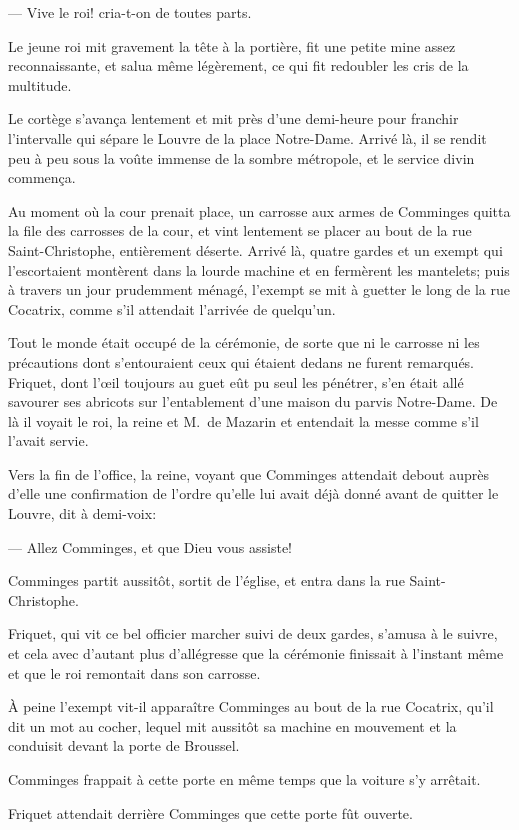 — Vive le roi! cria-t-on de toutes parts.

Le jeune roi mit gravement la tête à la portière, fit une petite mine assez reconnaissante, et salua même légèrement, ce qui fit redoubler les cris de la multitude.

Le cortège s'avança lentement et mit près d'une demi-heure pour franchir l'intervalle qui sépare le Louvre de la place Notre-Dame. Arrivé là, il se rendit peu à peu sous la voûte immense de la sombre métropole, et le service divin commença.

Au moment où la cour prenait place, un carrosse aux armes de Comminges quitta la file des carrosses de la cour, et vint lentement se placer au bout de la rue Saint-Christophe, entièrement déserte. Arrivé là, quatre gardes et un exempt qui l'escortaient montèrent dans la lourde machine et en fermèrent les mantelets; puis à travers un jour prudemment ménagé, l'exempt se mit à guetter le long de la rue Cocatrix, comme s'il attendait l'arrivée de quelqu'un.

Tout le monde était occupé de la cérémonie, de sorte que ni le carrosse ni les précautions dont s'entouraient ceux qui étaient dedans ne furent remarqués. Friquet, dont l'œil toujours au guet eût pu seul les pénétrer, s'en était allé savourer ses abricots sur l'entablement d'une maison du parvis Notre-Dame. De là il voyait le roi, la reine et M.~de Mazarin et entendait la messe comme s'il l'avait servie.

Vers la fin de l'office, la reine, voyant que Comminges attendait debout auprès d'elle une confirmation de l'ordre qu'elle lui avait déjà donné avant de quitter le Louvre, dit à demi-voix:

— Allez Comminges, et que Dieu vous assiste!

Comminges partit aussitôt, sortit de l'église, et entra dans la rue Saint-Christophe.

Friquet, qui vit ce bel officier marcher suivi de deux gardes, s'amusa à le suivre, et cela avec d'autant plus d'allégresse que la cérémonie finissait à l'instant même et que le roi remontait dans son carrosse.

À peine l'exempt vit-il apparaître Comminges au bout de la rue Cocatrix, qu'il dit un mot au cocher, lequel mit aussitôt sa machine en mouvement et la conduisit devant la porte de Broussel.

Comminges frappait à cette porte en même temps que la voiture s'y arrêtait.

Friquet attendait derrière Comminges que cette porte fût ouverte.

